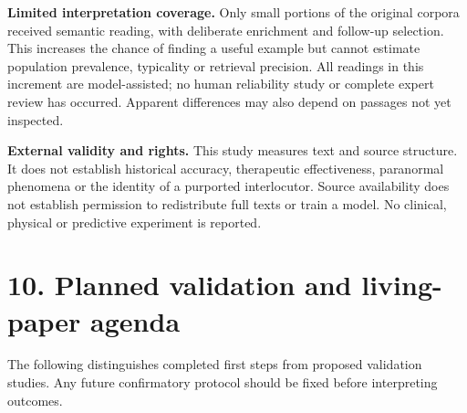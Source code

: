 \documentclass[
  11pt,
]{article}
\begin{document}
\textbf{Limited interpretation coverage.} Only small portions of the
original corpora received semantic reading, with deliberate enrichment
and follow-up selection. This increases the chance of finding a useful
example but cannot estimate population prevalence, typicality or
retrieval precision. All readings in this increment are model-assisted;
no human reliability study or complete expert review has occurred.
Apparent differences may also depend on passages not yet inspected.

\textbf{External validity and rights.} This study measures text and
source structure. It does not establish historical accuracy, therapeutic
effectiveness, paranormal phenomena or the identity of a purported
interlocutor. Source availability does not establish permission to
redistribute full texts or train a model. No clinical, physical or
predictive experiment is reported.

\FloatBarrier

\section{10. Planned validation and living-paper
agenda}\label{planned-validation-and-living-paper-agenda}

The following distinguishes completed first steps from proposed
validation studies. Any future confirmatory protocol should be fixed
before interpreting outcomes.
\end{document}
